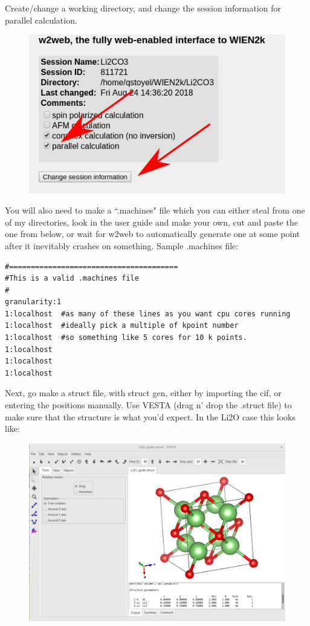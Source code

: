 \documentclass[12pt]{article}
\begin{document}
Create/change a working directory, and change the session information for parallel calculation.
	
	\begin{figure}[H]
		\includegraphics[scale=0.5]{./images/parallel.png}
	\end{figure}
	
You will also need to make a ``.machines" file which you can either steal from one of my directories, look in the user guide and make your own, cut and paste the one from below, or wait for w2web to automatically generate one at some point after it inevitably crashes on something.
Sample .machines file: 

\begin{lstlisting}
#=======================================
#This is a valid .machines file
#
granularity:1
1:localhost  #as many of these lines as you want cpu cores running
1:localhost  #ideally pick a multiple of kpoint number 
1:localhost  #so something like 5 cores for 10 k points.
1:localhost
1:localhost
1:localhost

\end{lstlisting}

Next, go make a struct file, with struct gen, either by importing the cif, or entering the positions manually.  Use VESTA (drag n' drop the .struct file) to make sure that the structure is what you'd expect. 
In the Li2O case this looks like: 

	\begin{figure}[H]
	\includegraphics[scale=0.35]{./images/Li2O_struct.png}
\end{figure}
\end{document}
